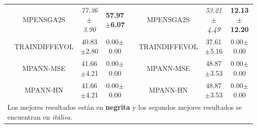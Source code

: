 \begin{landscape}
\begin{longtable}{cccccccc}
\rowcolor[rgb]{0.86,0.94,1} & MPENSGA2S & \textit{77.36$\pm$3.90} &
\textbf{57.97$\pm$6.07} &  & MPENSGA2S & \textit{53.21$\pm$4.49} &
\textbf{12.13$\pm$12.20} \\
\rowcolor[rgb]{0.86,0.94,1} & TRAINDIFFEVOL & 40.83$\pm$2.80 & 0.00$\pm$0.00 &  &
TRAINDIFFEVOL & 37.61$\pm$5.16 & 0.00$\pm$0.00 \\
\rowcolor[rgb]{0.86,0.94,1} & MPANN-MSE & 41.66$\pm$4.21 & 0.00$\pm$0.00 &  & MPANN-MSE &
48.87$\pm$3.53 & 0.00$\pm$0.00 \\
\rowcolor[rgb]{0.86,0.94,1} & MPANN-HN & 41.66$\pm$4.21 & 0.00$\pm$0.00 &  & MPANN-HN &
48.87$\pm$3.53 & 0.00$\pm$0.00 \\ \hline
\multicolumn{8}{l}{Los mejores resultados están en \textbf{negrita} y los segundos mejores
resultados se encuentran en \textit{itálica}.} \\
\end{longtable}
\end{landscape}

